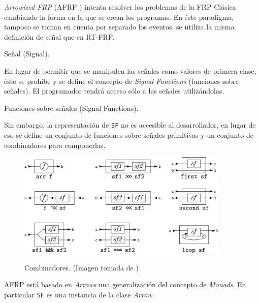 
  \textit{Arrowized FRP} (AFRP
\cite{nilsson2002:arrows} \cite{hudak2002:arrows}) intenta
resolver los problemas de la FRP Clásica cambiando la forma
en la que se crean los programas.
  En éste paradigma, tampoco se toman en cuenta por separado los
eventos, se utiliza la misma definición de señal que en RT-FRP.

\begin{definicion}
  Señal (Signal).
\end{definicion}

  En lugar de permitir que se manipulen las señales como valores
de primera clase, ésto se prohibe y se define el concepto de
\textit{Signal Functions} (funciones sobre señales). El programador
tendrá acceso sólo a las señales utilizándolas.

\begin{definicion}
  Funciones sobre señales (Signal Functions).
\end{definicion}

  Sin embargo, la representación de \texttt{SF} no es accesible al
desarrollador, en lugar de eso se define un conjunto de funciones
sobre señales primitivas y un conjunto de combinadores
 para componerlas.


\begin{figure}[h]
\begin{center}
  \caption{Combinadores. (Imagen tomada de \cite{yampa})}
\includegraphics[width=0.9\textwidth]{graphs/yampasf.png}
\label{fig:arrowcombinators}
\end{center}
\end{figure}

  AFRP está basado en \textit{Arrows} \cite{hughes1998:arrows}
una generalización del concepto de \textit{Monads}. En particular
\texttt{SF} es una instancia de la clase \textit{Arrow}.

